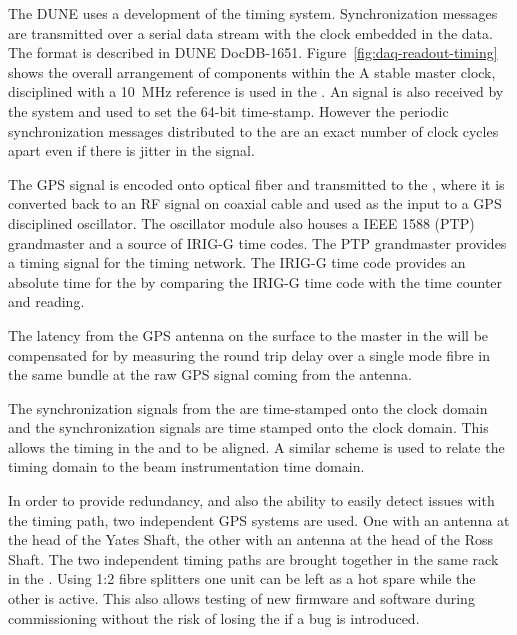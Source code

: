 \documentclass{article}
\begin{document}
The DUNE  uses a development of the  timing system. 
Synchronization messages are transmitted over a serial
data stream with the clock embedded in the data. The format is
described in 
DUNE DocDB-1651. 
Figure~\ref{fig:daq-readout-timing}
shows the overall arrangement of components within the 
A stable master clock, disciplined with a \SI{10}{\MHz}
reference is used in the . An  signal is
also received by the system and used to set the  64-bit time-stamp. However the periodic synchronization
messages distributed to the   are an exact number
of clock cycles apart even if there is jitter in the  signal.

The GPS signal is encoded onto optical fiber and transmitted to the
, where it is converted back to an RF signal on coaxial cable and
used as the input to a GPS disciplined oscillator. The oscillator module
also houses a IEEE 1588 (PTP) grandmaster and a source of IRIG-G time codes. The PTP grandmaster provides a timing signal for the  
timing network. The IRIG-G time code provides an absolute time for the  by comparing the IRIG-G time code with the  time counter and reading.

The latency from the GPS antenna on the surface to the  master in
the  will be compensated for by measuring the round trip delay over a single mode fibre in the same bundle at the raw GPS signal coming from the antenna. 

The  synchronization signals from the   are
time-stamped onto the  clock domain and the  synchronization
signals are time stamped onto the  clock domain. This allows
the timing in the  and   to be
aligned. A similar scheme is used to relate the 
 timing domain to the beam instrumentation
 time domain.

In order to provide redundancy, and also the ability to easily detect
issues with the timing path, two independent GPS systems are used. One
with an antenna at the head of the Yates Shaft, the other with an
antenna at the head of the Ross Shaft. The two independent timing
paths are brought together in the same rack in the . Using 1:2
fibre splitters one  unit can be left as a hot spare while the
other is active. This also allows testing of new firmware and software
during commissioning without the risk of losing the  if a bug is
introduced.
\end{document}
